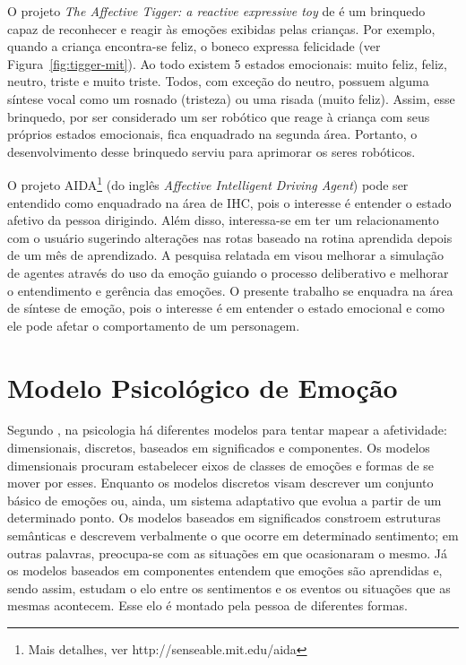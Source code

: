 O projeto \emph{The Affective Tigger: a reactive expressive toy} de
\citet{kirsch1999affective} é um brinquedo capaz de reconhecer e reagir às
emoções exibidas pelas crianças. Por exemplo, quando a criança encontra-se
feliz, o boneco expressa felicidade (ver Figura~\ref{fig:tigger-mit}). Ao todo
existem 5 estados emocionais: muito feliz, feliz, neutro, triste e muito
triste. Todos, com exceção do neutro, possuem alguma síntese vocal como um
rosnado (tristeza) ou uma risada (muito feliz). Assim, esse brinquedo, por ser
considerado um ser robótico que reage à criança com seus próprios estados
emocionais, fica enquadrado na segunda área.  Portanto, o desenvolvimento
desse brinquedo serviu para aprimorar os seres robóticos.

O projeto AIDA\footnote{Mais detalhes, ver http://senseable.mit.edu/aida} (do
inglês \emph{Affective Intelligent Driving Agent}) pode ser entendido como
enquadrado na área de IHC, pois o interesse é entender o estado afetivo da
pessoa dirigindo. Além disso, interessa-se em ter um relacionamento com o
usuário sugerindo alterações nas rotas baseado na rotina aprendida depois de
um mês de aprendizado.  A pesquisa relatada em \citet{dias-agents} visou
melhorar a simulação de agentes através do uso da emoção guiando o processo
deliberativo e melhorar o entendimento e gerência das emoções.  O presente
trabalho se enquadra na área de síntese de emoção, pois o interesse é em
entender o estado emocional e como ele pode afetar o comportamento de um
personagem.

\section{Modelo Psicológico de Emoção}

Segundo \citet{scherer2000tnoe}, na psicologia há diferentes modelos para
tentar mapear a afetividade: dimensionais, discretos, baseados em significados
e componentes. Os modelos dimensionais procuram estabelecer eixos de classes
de emoções e formas de se mover por esses.  Enquanto os modelos discretos
visam descrever um conjunto básico de emoções ou, ainda, um sistema adaptativo
que evolua a partir de um determinado ponto.  Os modelos baseados em
significados constroem estruturas semânticas e descrevem verbalmente o que
ocorre em determinado sentimento; em outras palavras, preocupa-se com as
situações em que ocasionaram o mesmo. Já os modelos baseados em componentes
entendem que emoções são aprendidas e, sendo assim, estudam o elo entre os
sentimentos e os eventos ou situações que as mesmas acontecem. Esse elo é
montado pela pessoa de diferentes formas.

